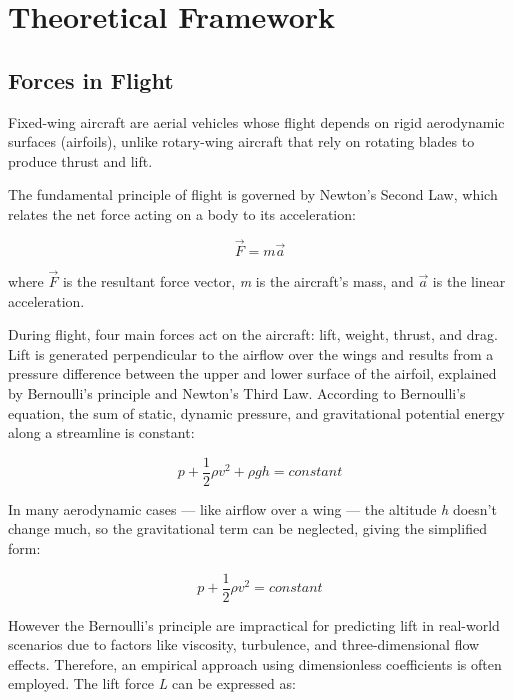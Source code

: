 \chapter{Theoretical Framework}

\section{Forces in Flight}

Fixed-wing aircraft are aerial vehicles whose flight depends on rigid aerodynamic surfaces (airfoils), unlike rotary-wing aircraft that rely on rotating blades to produce thrust and lift.

The fundamental principle of flight is governed by Newton's Second Law, which relates the net force acting on a body to its acceleration:

\begin{equation}
    \vec{F} = m\vec{a}
\end{equation}

where $\vec{F}$ is the resultant force vector, \textit{m} is the aircraft's mass, and $\vec{a}$ is the linear acceleration.

During flight, four main forces act on the aircraft: lift, weight, thrust, and drag. Lift is generated perpendicular to the airflow over the wings and results from a pressure difference between the upper and lower surface of the airfoil, explained by Bernoulli's principle and Newton's Third Law. According to Bernoulli's equation, the sum of static, dynamic pressure, and gravitational potential energy along a streamline is constant:

\begin{equation}
    p + \frac{1}{2} \rho v^2 + \rho g h = constant
\end{equation}

In many aerodynamic cases — like airflow over a wing — the altitude \textit{h} doesn’t change much, so the gravitational term can be neglected, giving the simplified form:

\begin{equation}
    p + \frac{1}{2} \rho v^2 = constant
\end{equation}

However the Bernoulli's principle are impractical for predicting lift in real-world scenarios due to factors like viscosity, turbulence, and three-dimensional flow effects. Therefore, an empirical approach using dimensionless coefficients is often employed. The lift force \textit{L} can be expressed as:

